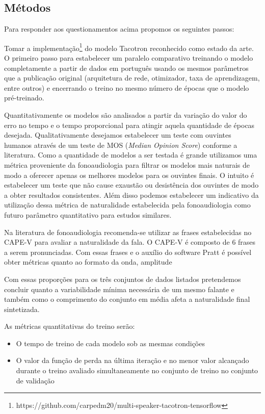 \documentclass{article}
\begin{document}
\subsection{Métodos}
Para responder aos questionamentos acima propomos os seguintes passos:

Tomar a implementação\footnote{https://github.com/carpedm20/multi-speaker-tacotron-tensorflow} do modelo Tacotron \cite{tacotron2} reconhecido como estado da arte. O primeiro passo para estabelecer um paralelo comparativo treinando o modelo completamente a partir de dados em português usando os mesmos parâmetros que a publicação original (arquitetura de rede, otimizador, taxa de aprendizagem, entre outros) e encerrando o treino no mesmo número de épocas que o modelo pré-treinado.



Quantitativamente os modelos são analisados a partir da variação do valor do erro no tempo e o tempo proporcional para atingir aquela quantidade de épocas desejada. Qualitativamente desejamos estabelecer um teste com ouvintes humanos através de um teste de MOS (\textit{Median Opinion Score}) conforme a literatura. Como a quantidade de modelos a ser testada é grande utilizamos uma métrica proveniente da fonoaudiologia para filtrar os modelos mais naturais de modo a oferecer apenas os melhores modelos para os ouvintes finais. O intuito é estabelecer um teste que não cause exaustão ou desistência dos ouvintes de modo a obter resultados consistentes. Além disso podemos estabelecer um indicativo da utilização dessa métrica de naturalidade estabelecida pela fonoaudiologia como futuro parâmetro quantitativo para estudos similares.

Na literatura de fonoaudiologia recomenda-se utilizar as frases estabelecidas no CAPE-V para avaliar a naturalidade da fala. O CAPE-V é composto de 6 frases a serem pronunciadas. Com essas frases e o auxílio do software Pratt é possível obter métricas quanto ao formato da onda, amplitude 

Com essas proporções para os três conjuntos de dados listados pretendemos concluir  quanto a variabilidade mínima necessária de um mesmo falante e também como o comprimento do conjunto em média afeta a naturalidade final sintetizada.

As métricas quantitativas do treino serão:
\begin{itemize}
    \item O tempo de treino de cada modelo sob as mesmas condições
    \item O valor da função de perda na última iteração e no menor valor alcançado durante o treino avaliado simultaneamente no conjunto de treino no conjunto de validação
\end{itemize}
\end{document}
